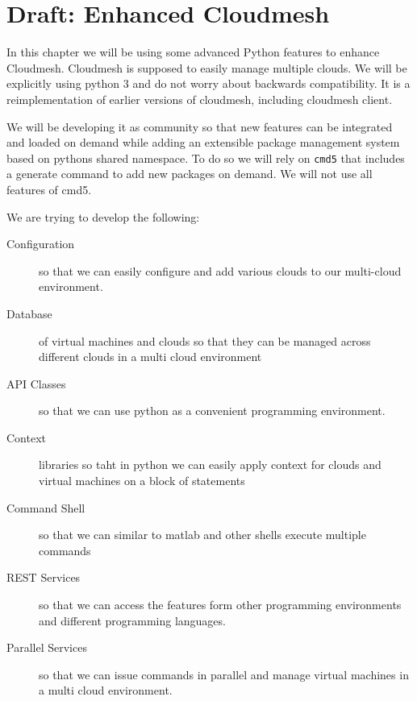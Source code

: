 \chapter{Draft: Enhanced Cloudmesh}

In this chapter we will be using some advanced Python features to
enhance Cloudmesh. Cloudmesh is supposed to easily manage multiple
clouds. We will be explicitly using python 3 and do
not worry about backwards compatibility. It is a reimplementation of
earlier versions of cloudmesh, including cloudmesh client.

We will be developing it as community so that new features can be
integrated and loaded on demand while adding an extensible package
management system based on pythons shared namespace. To do so we will
rely on \verb|cmd5| that includes a generate command to add new
packages on demand. We will not use all features of cmd5.

We are trying to develop the following:

\begin{description}

\item[Configuration] so that we can easily configure and add various
  clouds to our multi-cloud environment.

\item[Database] of virtual machines and clouds so that they can be
  managed across different clouds in a multi cloud environment

\item[API Classes] so that we can use python as a convenient
  programming environment.

\item[Context] libraries so taht in python we can easily apply context
  for clouds and virtual machines on a block of statements

\item[Command Shell] so that we can similar to matlab
  and other shells execute multiple commands

\item[REST Services]  so that we can access the features
form other programming environments and different programming
languages.

\item[Parallel Services] so that we can issue commands in parallel and
  manage virtual machines in a multi cloud environment.

\end{description}



